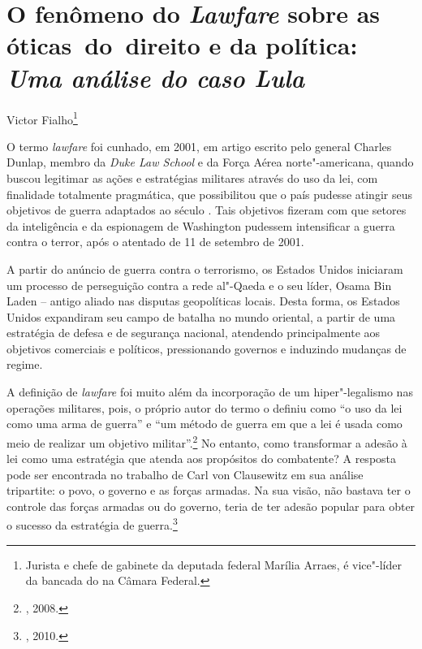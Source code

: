 \chapter*{O fenômeno do \emph{Lawfare} sobre as óticas~do~direito e da política:\\
\emph{Uma análise do caso Lula}}

\begin{flushright}
Victor Fialho\footnote{Jurista e chefe de gabinete da deputada federal Marília Arraes, é vice"-líder da bancada do  na Câmara Federal.}
\end{flushright}

O termo \emph{lawfare} foi cunhado, em 2001, em artigo escrito pelo
general Charles Dunlap, membro da \emph{Duke Law School} e da Força
Aérea norte"-americana, quando buscou legitimar as ações e estratégias
militares através do uso da lei, com finalidade totalmente pragmática,
que possibilitou que o país pudesse atingir seus objetivos de guerra
adaptados ao século . Tais objetivos fizeram com que setores da
inteligência e da espionagem de Washington pudessem intensificar a
guerra contra o terror, após o atentado de 11 de setembro de 2001.

A partir do anúncio de guerra contra o terrorismo, os Estados Unidos
iniciaram um processo de perseguição contra a rede al"-Qaeda e o seu
líder, Osama Bin Laden -- antigo aliado nas disputas geopolíticas locais.
Desta forma, os Estados Unidos expandiram seu campo de batalha no mundo
oriental, a partir de uma estratégia de defesa e de segurança nacional,
atendendo principalmente aos objetivos comerciais e políticos,
pressionando governos e induzindo mudanças de regime.

A definição de \emph{lawfare} foi muito além da incorporação de um
hiper"-legalismo nas operações militares, pois, o próprio autor do termo
o definiu como ``o uso da lei como uma arma de guerra'' e ``um método de
guerra em que a lei é usada como meio de realizar um objetivo militar''.\footnote{, 2008.} No entanto, como transformar a adesão à lei como uma
estratégia que atenda aos propósitos do combatente? A resposta pode ser
encontrada no trabalho de Carl von Clausewitz em sua análise tripartite:
o povo, o governo e as forças armadas. Na sua visão, não bastava ter o
controle das forças armadas ou do governo, teria de ter adesão popular
para obter o sucesso da estratégia de guerra.\footnote{, 2010.}


